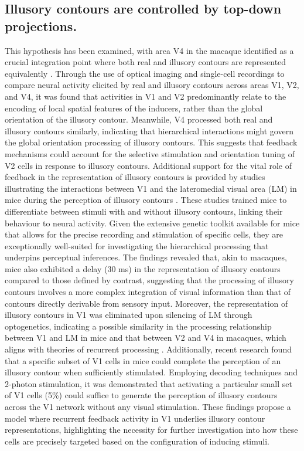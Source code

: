 \documentclass[12pt]{article}
\begin{document}
\subsection{Illusory contours are controlled by top-down projections.}
This hypothesis has been examined, with area V4 in the macaque identified as a crucial integration point where both real and illusory contours are represented equivalently \autocite{panEquivalentRepresentationReal2012}. Through the use of optical imaging and single-cell recordings to compare neural activity elicited by real and illusory contours across areas V1, V2, and V4, it was found that activities in V1 and V2 predominantly relate to the encoding of local spatial features of the inducers, rather than the global orientation of the illusory contour. Meanwhile, V4 processed both real and illusory contours similarly, indicating that hierarchical interactions might govern the global orientation processing of illusory contours. This suggests that feedback mechanisms could account for the selective stimulation and orientation tuning of V2 cells in response to illusory contours. Additional support for the vital role of feedback in the representation of illusory contours is provided by studies illustrating the interactions between V1 and the lateromedial visual area (LM) in mice during the perception of illusory contours \autocite{pakTopDownFeedbackControls2020}. These studies trained mice to differentiate between stimuli with and without illusory contours, linking their behaviour to neural activity. Given the extensive genetic toolkit available for mice that allows for the precise recording and stimulation of specific cells, they are exceptionally well-suited for investigating the hierarchical processing that underpins perceptual inferences. The findings revealed that, akin to macaques, mice also exhibited a delay (30 ms) in the representation of illusory contours compared to those defined by contrast, suggesting that the processing of illusory contours involves a more complex integration of visual information than that of contours directly derivable from sensory input. Moreover, the representation of illusory contours in V1 was eliminated upon silencing of LM through optogenetics, indicating a possible similarity in the processing relationship between V1 and LM in mice and that between V2 and V4 in macaques, which aligns with theories of recurrent processing \autocite{wyatteEarlyRecurrentFeedback2014}. Additionally, recent research \cite{shinRecurrentPatternCompletion2023} found that a specific subset of V1 cells in mice could complete the perception of an illusory contour when sufficiently stimulated. Employing decoding techniques and 2-photon stimulation, it was demonstrated that activating a particular small set of V1 cells (5\%) could suffice to generate the perception of illusory contours across the V1 network without any visual stimulation. These findings propose a model where recurrent feedback activity in V1 underlies illusory contour representations, highlighting the necessity for further investigation into how these cells are precisely targeted based on the configuration of inducing stimuli.
\end{document}

